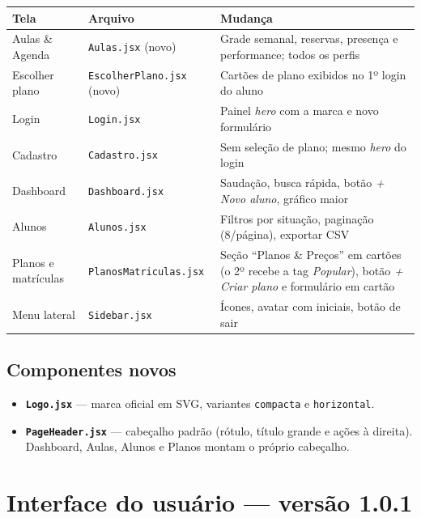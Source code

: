 \documentclass[11pt,a4paper]{article}
\newcommand{\cod}[1]{\texttt{#1}}
\begin{document}
\begin{xltabular}{\textwidth}{l l Y}
  \toprule
  \textbf{Tela} & \textbf{Arquivo} & \textbf{Mudança} \\
  \midrule
  \endhead
  Aulas \& Agenda     & \cod{Aulas.jsx} (novo)         & Grade semanal, reservas, presença e performance; todos os perfis \\
  Escolher plano      & \cod{EscolherPlano.jsx} (novo) & Cartões de plano exibidos no 1º login do aluno \\
  Login               & \cod{Login.jsx}                & Painel \textit{hero} com a marca e novo formulário \\
  Cadastro            & \cod{Cadastro.jsx}             & Sem seleção de plano; mesmo \textit{hero} do login \\
  Dashboard           & \cod{Dashboard.jsx}            & Saudação, busca rápida, botão \textit{+ Novo aluno}, gráfico maior \\
  Alunos              & \cod{Alunos.jsx}               & Filtros por situação, paginação (8/página), exportar CSV \\
  Planos e matrículas & \cod{PlanosMatriculas.jsx}     & Seção ``Planos \& Preços'' em cartões (o 2º recebe a tag \textit{Popular}), botão \textit{+ Criar plano} e formulário em cartão \\
  Menu lateral        & \cod{Sidebar.jsx}              & Ícones, avatar com iniciais, botão de sair \\
  \bottomrule
\end{xltabular}

\subsection{Componentes novos}

\begin{itemize}
  \item \textbf{\cod{Logo.jsx}} --- marca oficial em SVG, variantes \cod{compacta} e \cod{horizontal}.
  \item \textbf{\cod{PageHeader.jsx}} --- cabeçalho padrão (rótulo, título grande e ações à direita).
        Dashboard, Aulas, Alunos e Planos montam o próprio cabeçalho.
\end{itemize}

\section{Interface do usuário --- versão 1.0.1}\label{sec:ui}
\end{document}
